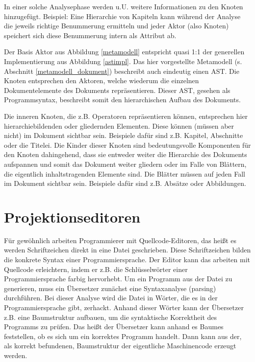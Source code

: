  
In einer solche Analysephase werden u.U. weitere Informationen zu den Knoten hinzugefügt. Beispiel: Eine Hierarchie von Kapiteln kann während der Analyse die jeweils richtige Benummerung ermitteln und jeder Aktor (also Knoten) speichert sich diese Benummerung intern als Attribut ab.

 
Der Basis Aktor aus Abbildung \ref{metamodell} entspricht quasi 1:1 der generellen Implementierung aus Abbildung \ref{astimpl}. Das hier vorgestellte Metamodell (s. Abschnitt \ref{metamodell_dokument}) beschreibt auch eindeutig einen AST. Die Knoten entsprechen den Aktoren, welche wiederum die einzelnen Dokumentelemente des Dokuments repräsentieren. Dieser AST, gesehen als Programmsyntax, beschreibt somit den hierarchischen Aufbau des Dokuments.

 
Die inneren Knoten, die z.B. Operatoren repräsentieren können, entsprechen hier hierarchiebildenden oder gliedernden Elementen. Diese können (müssen aber nicht) im Dokument sichtbar sein. Beispiele dafür sind z.B. Kapitel, Abschnitte oder die Titelei. Die Kinder dieser Knoten sind bedeutungsvolle Komponenten für den Knoten dahingehend, dass sie entweder weiter die Hierarchie des Dokuments aufspannen und somit das Dokument weiter gliedern oder im Falle von Blättern, die eigentlich inhaltstragenden Elemente sind. Die Blätter müssen auf jeden Fall im Dokument sichtbar sein. Beispiele dafür sind z.B. Absätze oder Abbildungen.

 
\section{Projektionseditoren}\label{}
 
Für gewöhnlich arbeiten Programmierer mit Quellcode-Editoren, das heißt es werden Schriftzeichen direkt in eine Datei geschrieben. Diese Schriftzeichen bilden die konkrete Syntax einer Programmiersprache. Der Editor kann das arbeiten mit Quellcode erleichtern, indem er z.B. die Schlüsselwörter einer Programmiersprache farbig hervorhebt. Um ein Programm aus der Datei zu generieren, muss ein Übersetzer zunächst eine Syntaxanalyse (parsing) durchführen. Bei dieser Analyse wird die Datei in Wörter, die es in der Programmiersprache gibt, zerhackt. Anhand dieser Wörter kann der Übersetzer z.B. eine Baumstruktur aufbauen, um die syntaktische Korrektheit des Programms zu prüfen. Das heißt der Übersetzer kann anhand es Baumes feststellen, ob es sich um ein korrektes Programm handelt. Dann kann aus der, als korrekt befundenen, Baumstruktur der eigentliche Maschinencode erzeugt werden.

